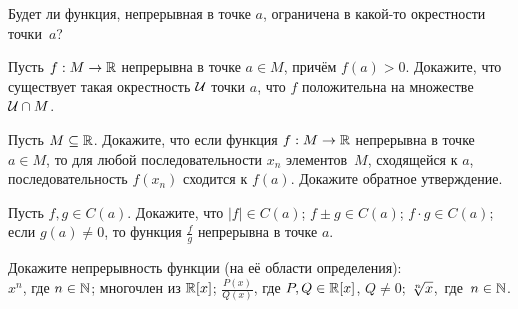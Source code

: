 \documentclass[a4paper,12pt]{article}
\begin{document}
 Будет ли функция, непрерывная в точке $a$, ограничена
в какой-то окрестности точки~$a$?

Пусть $f:M \rightarrow \mathbb{R}$ непрерывна в точке $a\in M$, причём $f(a) > 0$.
Докажите, что существует такая окрестность $\cal U$ точки $a$, что $f$
положительна на множестве ${\cal U} \cap M$.



%

Пусть $M \subseteq\mathbb{R}$.  Докажите, что если функция $f:M\rightarrow\mathbb{R}$ непрерывна в точке $a\in M$, то
для любой последовательности $x_n$ элементов~$M$, сходящейся к $a$, последовательность $f(x_n)$ сходится к $f(a)$.
 Докажите обратное утверждение.




 Пусть $f, g\in C(a)$. Докажите, что
 $|f|\in C(a)$;
 $f\pm g\in C(a)$;%
 $f\cdot g\in C(a)$; %
 если %
$g(a) \neq 0$,
то функция $\frac{f}{g}$ %
непрерывна в точке $a$.

 Докажите непрерывность функции (на её области
определения):
\\
 $x^n$, где $n\in\mathbb{N}$;
 многочлен из $\mathbb{R}[x]$;
 $\frac{P(x)}{Q(x)}$, где $P,Q\in\mathbb{R}[x]$, $Q\ne0$;
 \hskip-1pt $\root n \of x$,~где~$n\in\mathbb{N}$.
\end{document}
